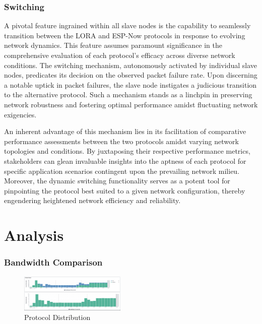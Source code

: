 \subsubsection{Switching}\label{sec:switching}

A pivotal feature ingrained within all slave nodes is the capability to seamlessly transition between the LORA and ESP-Now protocols in response to evolving network dynamics. This feature assumes paramount significance in the comprehensive evaluation of each protocol's efficacy across diverse network conditions. The switching mechanism, autonomously activated by individual slave nodes, predicates its decision on the observed packet failure rate. Upon discerning a notable uptick in packet failures, the slave node instigates a judicious transition to the alternative protocol. Such a mechanism stands as a linchpin in preserving network robustness and fostering optimal performance amidst fluctuating network exigencies.

An inherent advantage of this mechanism lies in its facilitation of comparative performance assessments between the two protocols amidst varying network topologies and conditions. By juxtaposing their respective performance metrics, stakeholders can glean invaluable insights into the aptness of each protocol for specific application scenarios contingent upon the prevailing network milieu. Moreover, the dynamic switching functionality serves as a potent tool for pinpointing the protocol best suited to a given network configuration, thereby engendering heightened network efficiency and reliability.


\section*{Analysis}\label{sec:analysis}

\subsubsection{Bandwidth Comparison}\label{sec:bandwidth_comparison}
\begin{figure}[h]
  \begin{center}
    \includegraphics[width=0.45\textwidth]{./Figures/elk/protocol_count.png}
  \end{center}
  \caption{Protocol Distribution}\label{fig:protocol_distribution}
\end{figure}

